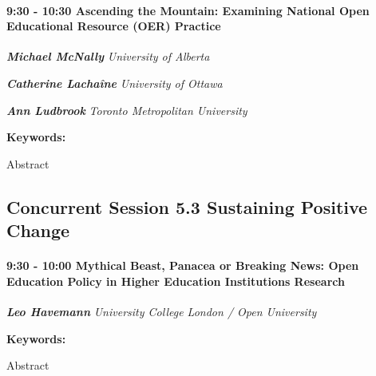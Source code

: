 \documentclass[
]{book}
\begin{document}
\begin{session}
\hypertarget{ascending-the-mountain-examining-national-open-educational-resource-oer-practice}{%
\paragraph*{\texorpdfstring{9:30 - 10:30 \textbar{} \textbf{Ascending
the Mountain: Examining National Open Educational Resource (OER)}
\textbar{}
Practice}{9:30 - 10:30 \textbar{} Ascending the Mountain: Examining National Open Educational Resource (OER) \textbar{} Practice}}\label{ascending-the-mountain-examining-national-open-educational-resource-oer-practice}}

\textbf{\emph{Michael McNally}} \textbar{} \emph{University of Alberta}

\textbf{\emph{Catherine Lachaîne}} \textbar{} \emph{University of
Ottawa}

\textbf{\emph{Ann Ludbrook}} \textbar{} \emph{Toronto Metropolitan
University}

\textbf{Keywords:}

Abstract
\end{session}

\hypertarget{concurrent-session-5.3-sustaining-positive-change}{%
\subsection*{Concurrent Session 5.3 \textbar{} Sustaining Positive Change}\label{concurrent-session-5.3-sustaining-positive-change}}

\begin{session}
\hypertarget{mythical-beast-panacea-or-breaking-news-open-education-policy-in-higher-education-institutions-research}{%
\paragraph*{\texorpdfstring{9:30 - 10:00 \textbar{} \textbf{Mythical
Beast, Panacea or Breaking News: Open Education Policy in Higher
Education Institutions} \textbar{}
Research}{9:30 - 10:00 \textbar{} Mythical Beast, Panacea or Breaking News: Open Education Policy in Higher Education Institutions \textbar{} Research}}\label{mythical-beast-panacea-or-breaking-news-open-education-policy-in-higher-education-institutions-research}}

\textbf{\emph{Leo Havemann}} \textbar{} \emph{University College London
/ Open University}

\textbf{Keywords:}

Abstract
\end{session}
\end{document}
